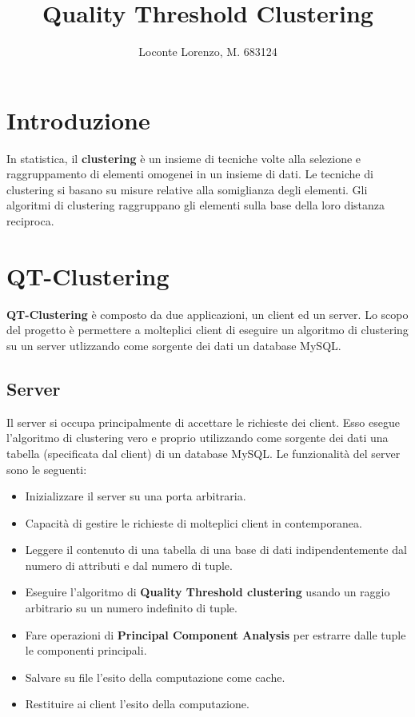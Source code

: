\documentclass{article}
\title{Quality Threshold Clustering}
\author{Loconte Lorenzo, M. 683124}
\begin{document}
	\maketitle
	\section{Introduzione}
	In statistica, il \textbf{clustering} è un insieme di tecniche volte
	alla selezione e raggruppamento di elementi omogenei in un insieme di
	dati. Le tecniche di clustering si basano su misure relative alla
	somiglianza degli elementi. Gli algoritmi di clustering raggruppano gli
	elementi sulla base della loro distanza reciproca.

	\section{QT-Clustering}
	\textbf{QT-Clustering} è composto da due applicazioni, un client ed un
	server. Lo scopo del progetto è permettere a molteplici client di
	eseguire un algoritmo di clustering su un server utlizzando come
	sorgente dei dati un database MySQL.

	\subsection{Server}
	Il server si occupa principalmente di accettare le richieste dei client.
	Esso esegue l'algoritmo di clustering vero e proprio utilizzando come
	sorgente dei dati una tabella (specificata dal client) di un database
	MySQL. Le funzionalità del server sono le seguenti:
	\begin{itemize}
		\item Inizializzare il server su una porta arbitraria.
		\item Capacità di gestire le richieste di molteplici client in
		contemporanea.
		\item Leggere il contenuto di una tabella di una base di dati
		indipendentemente dal numero di attributi e dal numero di tuple.
		\item Eseguire l'algoritmo di \textbf{Quality Threshold
		clustering} usando un raggio arbitrario su un numero indefinito
		di tuple.
		\item Fare operazioni di \textbf{Principal Component Analysis}
		per estrarre dalle tuple le componenti principali.
		\item Salvare su file l'esito della computazione come cache.
		\item Restituire ai client l'esito della computazione.
	\end{itemize}
\end{document}
